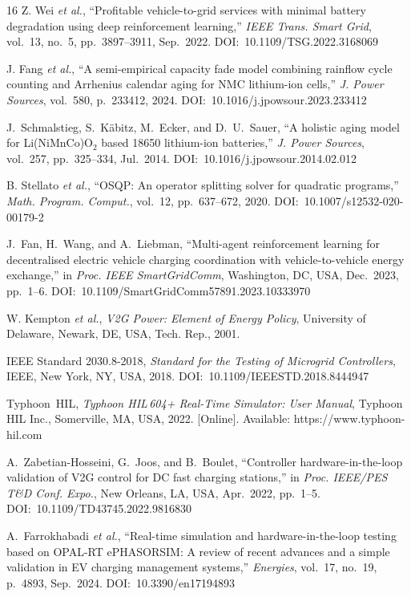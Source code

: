 \documentclass[journal,10pt,twocolumn]{IEEEtran}
\begin{document}
\begin{thebibliography}{16}
Z. Wei \textit{et al.},
``Profitable vehicle-to-grid services with minimal battery degradation
using deep reinforcement learning,''
\textit{IEEE Trans. Smart Grid}, vol.~13, no.~5, pp.~3897--3911,
Sep.~2022.
DOI:~10.1109/TSG.2022.3168069

J. Fang \textit{et al.},
``A semi-empirical capacity fade model combining rainflow cycle counting
and Arrhenius calendar aging for NMC lithium-ion cells,''
\textit{J. Power Sources}, vol.~580, p.~233412, 2024.
DOI:~10.1016/j.jpowsour.2023.233412

J.~Schmalstieg, S.~K\"{a}bitz, M.~Ecker, and D.~U.~Sauer,
``A holistic aging model for Li(NiMnCo)O$_2$ based 18650 lithium-ion
batteries,''
\textit{J. Power Sources}, vol.~257, pp.~325--334, Jul.~2014.
DOI:~10.1016/j.jpowsour.2014.02.012

B. Stellato \textit{et al.},
``OSQP: An operator splitting solver for quadratic programs,''
\textit{Math. Program. Comput.}, vol.~12, pp.~637--672, 2020.
DOI:~10.1007/s12532-020-00179-2

J.~Fan, H.~Wang, and A.~Liebman,
``Multi-agent reinforcement learning for decentralised electric vehicle
charging coordination with vehicle-to-vehicle energy exchange,''
in \textit{Proc. IEEE SmartGridComm}, Washington, DC, USA, Dec.~2023,
pp.~1--6.
DOI:~10.1109/SmartGridComm57891.2023.10333970

W. Kempton \textit{et al.},
\textit{V2G Power: Element of Energy Policy},
University of Delaware, Newark, DE, USA, Tech. Rep., 2001.


IEEE Standard 2030.8-2018, \textit{Standard for the Testing of Microgrid
Controllers}, IEEE, New York, NY, USA, 2018.
DOI:~10.1109/IEEESTD.2018.8444947

Typhoon~HIL, \textit{Typhoon HIL\,604+ Real-Time Simulator: User Manual},
Typhoon HIL Inc., Somerville, MA, USA, 2022.
[Online]. Available: https://www.typhoon-hil.com

A.~Zabetian-Hosseini, G.~Joos, and B.~Boulet,
``Controller hardware-in-the-loop validation of V2G control for DC fast
charging stations,''
in \textit{Proc. IEEE/PES T\&D Conf. Expo.}, New Orleans, LA, USA,
Apr.~2022, pp.~1--5.
DOI:~10.1109/TD43745.2022.9816830

A.~Farrokhabadi \textit{et al.},
``Real-time simulation and hardware-in-the-loop testing based on
OPAL-RT ePHASORSIM: A review of recent advances and a simple validation
in EV charging management systems,''
\textit{Energies}, vol.~17, no.~19, p.~4893, Sep.~2024.
DOI:~10.3390/en17194893



\end{thebibliography}
\end{document}
